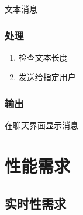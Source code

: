 文本消息

\subsubsection{处理}

\begin{enumerate}
	\item 检查文本长度
	\item 发送给指定用户

	\end{enumerate}

\subsubsection{输出}

在聊天界面显示消息

\section{性能需求}

\subsection{实时性需求}
% 
% 
% 
% 
% 
% 
% 
% 
% 
% 

